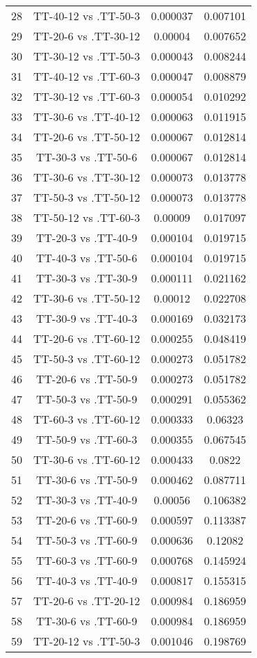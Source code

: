 \documentclass[a4paper,10pt]{article}
\begin{document}
\begin{landscape}
\begin{table}[!htp]
\begin{tabular}{cccc}
28&TT-40-12 vs .TT-50-3&0.000037&0.007101\\
29&TT-20-6 vs .TT-30-12&0.00004&0.007652\\
30&TT-30-12 vs .TT-50-3&0.000043&0.008244\\
31&TT-40-12 vs .TT-60-3&0.000047&0.008879\\
32&TT-30-12 vs .TT-60-3&0.000054&0.010292\\
33&TT-30-6 vs .TT-40-12&0.000063&0.011915\\
34&TT-20-6 vs .TT-50-12&0.000067&0.012814\\
35&TT-30-3 vs .TT-50-6&0.000067&0.012814\\
36&TT-30-6 vs .TT-30-12&0.000073&0.013778\\
37&TT-50-3 vs .TT-50-12&0.000073&0.013778\\
38&TT-50-12 vs .TT-60-3&0.00009&0.017097\\
39&TT-20-3 vs .TT-40-9&0.000104&0.019715\\
40&TT-40-3 vs .TT-50-6&0.000104&0.019715\\
41&TT-30-3 vs .TT-30-9&0.000111&0.021162\\
42&TT-30-6 vs .TT-50-12&0.00012&0.022708\\
43&TT-30-9 vs .TT-40-3&0.000169&0.032173\\
44&TT-20-6 vs .TT-60-12&0.000255&0.048419\\
45&TT-50-3 vs .TT-60-12&0.000273&0.051782\\
46&TT-20-6 vs .TT-50-9&0.000273&0.051782\\
47&TT-50-3 vs .TT-50-9&0.000291&0.055362\\
48&TT-60-3 vs .TT-60-12&0.000333&0.06323\\
49&TT-50-9 vs .TT-60-3&0.000355&0.067545\\
50&TT-30-6 vs .TT-60-12&0.000433&0.0822\\
51&TT-30-6 vs .TT-50-9&0.000462&0.087711\\
52&TT-30-3 vs .TT-40-9&0.00056&0.106382\\
53&TT-20-6 vs .TT-60-9&0.000597&0.113387\\
54&TT-50-3 vs .TT-60-9&0.000636&0.12082\\
55&TT-60-3 vs .TT-60-9&0.000768&0.145924\\
56&TT-40-3 vs .TT-40-9&0.000817&0.155315\\
57&TT-20-6 vs .TT-20-12&0.000984&0.186959\\
58&TT-30-6 vs .TT-60-9&0.000984&0.186959\\
59&TT-20-12 vs .TT-50-3&0.001046&0.198769\\

\end{tabular}
\end{table}
\end{landscape}
\end{document}
